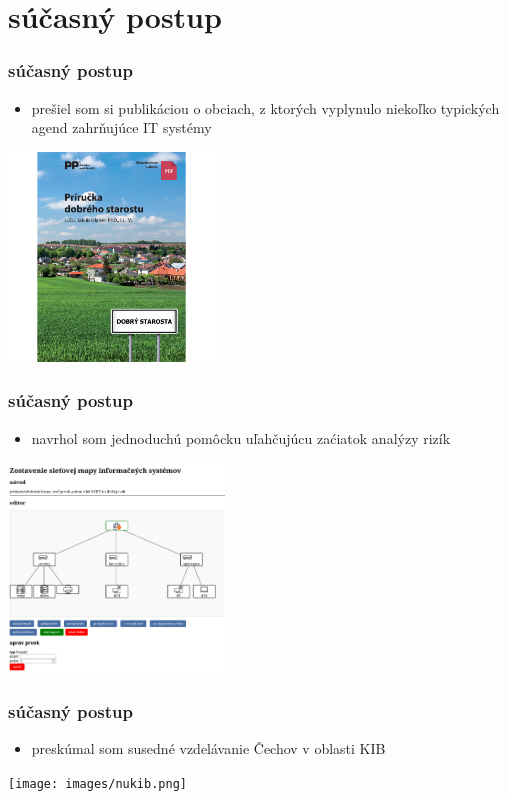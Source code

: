 \documentclass[11pt,xcolor={dvipsnames},hyperref={pdftex,pdfpagemode=UseNone,hidelinks,pdfdisplaydoctitle=true},usepdftitle=false]{beamer}
\begin{document}
\section{súčasný postup}
\begin{frame}
  \frametitle{súčasný postup}
  \begin{itemize}
    \item prešiel som si publikáciou o obciach, z ktorých vyplynulo niekoľko typických agend zahrňujúce IT systémy
  \end{itemize}
  \begin{center}
    \includegraphics[height=15em]{images/prirucka-dobreho-starostu.png}
  \end{center}
\end{frame}
\begin{frame}
  \frametitle{súčasný postup}
  \begin{itemize}
    \item navrhol som jednoduchú pomôcku uľahčujúcu zaćiatok analýzy rizík
  \end{itemize}
  \begin{center}
    \includegraphics[height=15em]{images/it-network-map-visualizer.png}
  \end{center}
\end{frame}
\begin{frame}
  \frametitle{súčasný postup}
  \begin{itemize}
    \item preskúmal som susedné vzdelávanie Čechov v oblasti KIB
  \end{itemize}
  \begin{center}
    \texttt{[image: images/nukib.png]}
  \end{center}
\end{frame}
\end{document}

